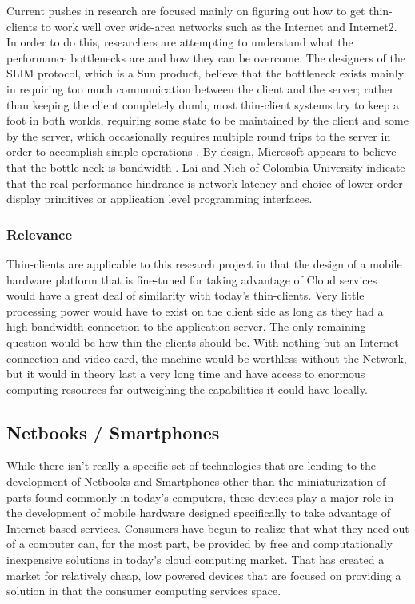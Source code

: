 \documentclass[12pt,oneside,letterpaper,titlepage]{article}
\begin{document}
Current pushes in research are focused mainly on figuring out how to get
thin-clients to work well over wide-area networks such as the Internet and
Internet2.  In order to do this, researchers are attempting to understand what
the performance bottlenecks are and how they can be overcome.  The designers of
the SLIM protocol, which is a Sun product, believe that the bottleneck exists
mainly in requiring too much communication between the client and the server;
rather than keeping the client completely dumb, most thin-client systems try to
keep a foot in both worlds, requiring some state to be maintained by the client
and some by the server, which occasionally requires multiple round trips to the
server in order to accomplish simple operations \citep{schmidt1999}.  By design,
Microsoft appears to believe that the bottle neck is bandwidth \citep{lai2002}.
Lai and Nieh of Colombia University indicate that the real performance hindrance
is network latency and choice of lower order display primitives or application
level programming interfaces.

\subsubsection{Relevance}

Thin-clients are applicable to this research project in that the design of a
mobile hardware platform that is fine-tuned for taking advantage of Cloud
services would have a great deal of similarity with today's thin-clients.  Very
little processing power would have to exist on the client side as long as they
had a high-bandwidth connection to the application server.  The only remaining
question would be how thin the clients should be.  With nothing but an Internet
connection and video card, the machine would be worthless without the Network,
but it would in theory last a very long time and have access to enormous
computing resources far outweighing the capabilities it could have locally.

\subsection{Netbooks / Smartphones}

While there isn't really a specific set of technologies that are lending to the
development of Netbooks and Smartphones other than the miniaturization of parts
found commonly in today's computers, these devices play a major role in the
development of mobile hardware designed specifically to take advantage of
Internet based services.  Consumers have begun to realize that what they need
out of a computer can, for the most part, be provided by free and
computationally inexpensive solutions in today's cloud computing market.  That
has created a market for relatively cheap, low powered devices that are focused
on providing a solution in that the consumer computing services space.
\end{document}
